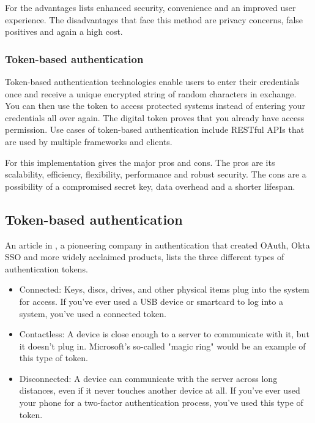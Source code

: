 For the advantages \textcite{Perez2022} lists enhanced security, convenience and an improved user experience. The disadvantages that face this method are privacy concerns, false positives and again a high cost.

\subsubsection{Token-based authentication}

Token-based authentication technologies enable users to enter their credentials once and receive a unique encrypted string of random characters in exchange. You can then use the token to access protected systems instead of entering your credentials all over again. The digital token proves that you already have access permission. Use cases of token-based authentication include RESTful APIs that are used by multiple frameworks and clients.

For this implementation \textcite{Malviya} gives the major pros and cons. The pros are its scalability, efficiency, flexibility, performance and robust security. The cons are a possibility of a compromised secret key, data overhead and a shorter lifespan.

\subsection{Token-based authentication}

An article in \textcite{Okta2023}, a pioneering company in authentication that created OAuth, Okta SSO and more widely acclaimed products, lists the three different types of authentication tokens.

\begin{itemize}
    \item Connected: Keys, discs, drives, and other physical items plug into the system for access. If you've ever used a USB device or smartcard to log into a system, you've used a connected token.
    \item Contactless: A device is close enough to a server to communicate with it, but it doesn't plug in. Microsoft's so-called "magic ring" would be an example of this type of token.
    \item Disconnected: A device can communicate with the server across long distances, even if it never touches another device at all. If you've ever used your phone for a two-factor authentication process, you've used this type of token.
\end{itemize}

